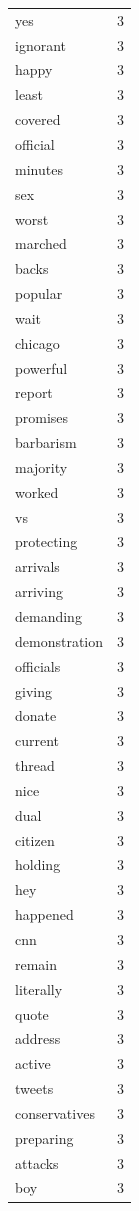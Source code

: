 \begin{tabular}{lr}
yes & 3 \\
ignorant & 3 \\
happy & 3 \\
least & 3 \\
covered & 3 \\
official & 3 \\
minutes & 3 \\
sex & 3 \\
worst & 3 \\
marched & 3 \\
backs & 3 \\
popular & 3 \\
wait & 3 \\
chicago & 3 \\
powerful & 3 \\
report & 3 \\
promises & 3 \\
barbarism & 3 \\
majority & 3 \\
worked & 3 \\
vs & 3 \\
protecting & 3 \\
arrivals & 3 \\
arriving & 3 \\
demanding & 3 \\
demonstration & 3 \\
officials & 3 \\
giving & 3 \\
donate & 3 \\
current & 3 \\
thread & 3 \\
nice & 3 \\
dual & 3 \\
citizen & 3 \\
holding & 3 \\
hey & 3 \\
happened & 3 \\
cnn & 3 \\
remain & 3 \\
literally & 3 \\
quote & 3 \\
address & 3 \\
active & 3 \\
tweets & 3 \\
conservatives & 3 \\
preparing & 3 \\
attacks & 3 \\
boy & 3 \\

\end{tabular}
